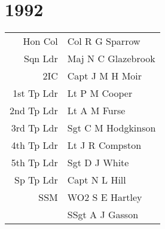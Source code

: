 \chapter*{1992}

\begin{center}
  \begin{tabular}{rl}
    Hon Col & Col R G Sparrow \\
    Sqn Ldr & Maj N C Glazebrook \\
    2IC & Capt J M H Moir \\
    1st Tp Ldr & Lt P M Cooper \\
    2nd Tp Ldr & Lt A M Furse \\
    3rd Tp Ldr & Sgt C M Hodgkinson \\
    4th Tp Ldr & Lt J R Compston \\
    5th Tp Ldr & Sgt D J White \\
    Sp Tp Ldr & Capt N L Hill \\
    SSM & WO2 S E Hartley \\
    & SSgt A J Gasson \\
  \end{tabular}
\end{center}

